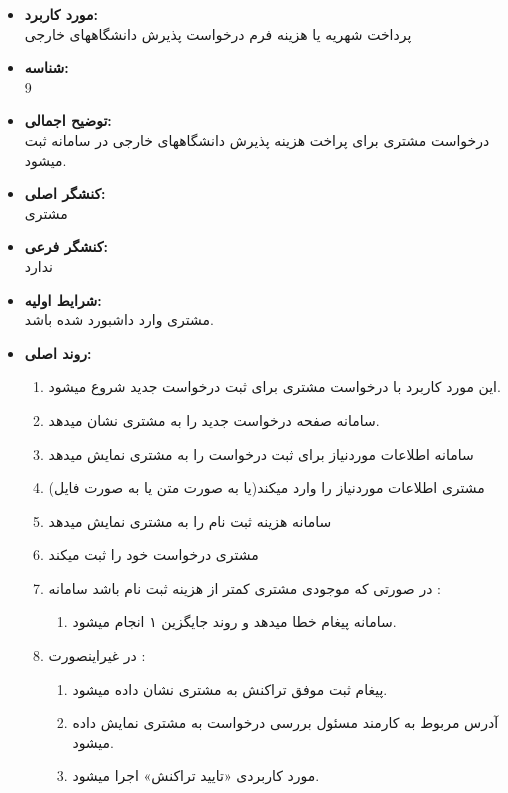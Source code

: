 \documentclass{article}
\begin{document}
\begin{itemize}
\item \textbf{مورد کاربرد:}\\
پرداخت شهریه یا هزینه فرم درخواست پذیرش دانشگاههای خارجی
\item \textbf{شناسه:}\\
9
\item \textbf{توضیح اجمالی:}\\
درخواست مشتری برای پراخت هزینه پذیرش دانشگاههای خارجی در سامانه ثبت میشود.
\item \textbf{کنشگر اصلی:}\\
مشتری
\item \textbf{کنشگر فرعی:}\\
ندارد
\item \textbf{شرایط اولیه:}\\
مشتری وارد داشبورد شده باشد.
\item \textbf{روند اصلی:}\\
\begin{enumerate}
\item  این مورد کاربرد با درخواست مشتری برای ثبت درخواست جدید شروع میشود.
\item سامانه صفحه درخواست جدید را به مشتری نشان میدهد.
\item سامانه اطلاعات موردنیاز برای ثبت درخواست را به مشتری نمایش میدهد
\item مشتری اطلاعات موردنیاز را وارد میکند(یا به صورت متن یا به صورت فایل)
\item سامانه هزینه ثبت نام را به مشتری نمایش میدهد
\item مشتری درخواست خود را ثبت میکند
\item در صورتی که موجودی مشتری کمتر از هزینه ثبت نام باشد سامانه :
\begin{enumerate}
\item سامانه پیغام خطا میدهد و روند جایگزین ۱ انجام میشود. 
\end{enumerate}

\item در غیراینصورت	:
\begin{enumerate}
\item پیغام ثبت موفق تراکنش به مشتری نشان داده میشود.
\item آدرس مربوط به کارمند مسئول بررسی درخواست به مشتری نمایش داده میشود.
\item مورد کاربردی «تایید تراکنش» اجرا میشود.
\end{enumerate}

\end{enumerate}


\end{itemize}
\end{document}
